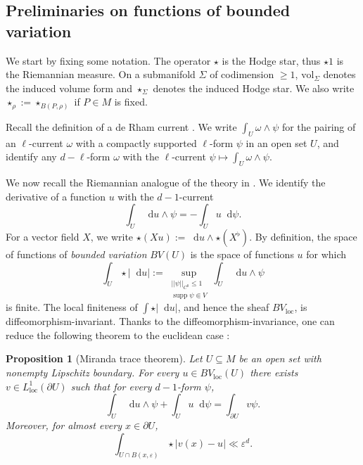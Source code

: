 \documentclass[reqno,10pt]{amsart}
\DeclareMathOperator{\supp}{supp}
\newcommand*\dif{\mathop{}\!\mathrm{d}}
\newcommand{\vol}{\mathrm{vol}}
\newcommand{\dfn}[1]{\emph{#1}\index{#1}}
\newcommand{\loc}{\mathrm{loc}}
\newtheorem{proposition}[theorem]{Proposition}
\theoremstyle{definition}
\numberwithin{equation}{section}
\begin{document}
\subsection{Preliminaries on functions of bounded variation}
We start by fixing some notation. The operator $\star$ is the Hodge star, thus $\star 1$ is the Riemannian measure.
On a submanifold $\Sigma$ of codimension $\geq 1$, $\vol_\Sigma$ denotes the induced volume form and $\star_\Sigma$ denotes the induced Hodge star. We also write $\star_\rho := \star_{B(P, \rho)}$ if $P \in M$ is fixed.

Recall the definition of a de Rham current \cite{simon1983GMT}.
We write $\int_U \omega \wedge \psi$ for the pairing of an $\ell$-current $\omega$ with a compactly supported $\ell$-form $\psi$ in an open set $U$, and identify any $d - \ell$-form $\omega$ with the $\ell$-current $\psi \mapsto \int_U \omega \wedge \psi$.

We now recall the Riemannian analogue of the theory in \cite[Chapter 1]{Giusti77}.
We identify the derivative of a function $u$ with the $d-1$-current
$$\int_U \dif u \wedge \psi = -\int_U u \dif \psi.$$
For a vector field $X$, we write $\star (Xu) := \dif u \wedge \star (X^\flat)$.
By definition, the space of functions of \dfn{bounded variation} $BV(U)$ is the space of functions $u$ for which
\begin{equation}\label{total variation}
\int_U \star |\dif u| := \sup_{\substack{||\psi||_{C^0} \leq 1\\\supp \psi \Subset V}} \int_U \dif u \wedge \psi
\end{equation}
is finite.
The local finiteness of $\int \star |\dif u|$, and hence the sheaf $BV_\loc$, is diffeomorphism-invariant.
Thanks to the diffeomorphism-invariance, one can reduce the following theorem to the euclidean case \cite[Teorema 1]{Miranda67}:

\begin{proposition}[Miranda trace theorem]\label{traces}
Let $U \subseteq M$ be an open set with nonempty Lipschitz boundary.
For every $u \in BV_\loc(U)$ there exists $v \in L^1_\loc(\partial U)$ such that for every $d-1$-form $\psi$,
\begin{equation}\label{Miranda IBP}
\int_U \dif u \wedge \psi + \int_U u \dif \psi = \int_{\partial U} v\psi.
\end{equation}
Moreover, for almost every $x \in \partial U$,
\begin{equation}\label{convergence of trace}
\int_{U \cap B(x, \varepsilon)} \star |v(x) - u| \ll \varepsilon^d.
\end{equation}
\end{proposition}
\end{document}
